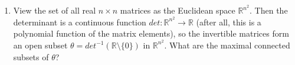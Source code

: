 \documentclass[11pt]{article}
\begin{document}
\begin{enumerate}
  \item
    View the set of all real \(n \times n\) matrices as the Euclidean space \(\mathbb{R}^{n^2}\).  Then the 
    determinant is a continuous function \(det \colon \mathbb{R}^{n^2} \to \mathbb{R}\) (after all, this is a 
    polynomial function of the matrix elements), so the invertible matrices form an open subset 
    \(\theta = det^{-1}(\mathbb{R} \setminus \{0\})\) in \(\mathbb{R}^{n^2}\).  What are the maximal connected 
    subsets of \(\theta\)?
  \newpage
\end{enumerate}
\end{document}
